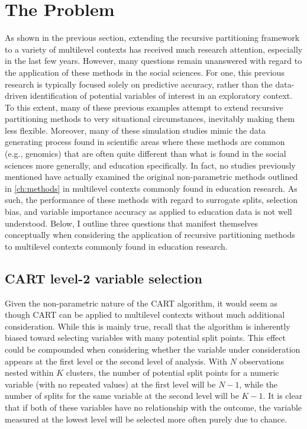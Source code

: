 
\chapter{The Problem} %

\label{ch:problem} %


	As shown in the previous section, extending the recursive partitioning framework to a variety of multilevel contexts has received much research attention, especially in the last few years. However, many questions remain unanswered with regard to the application of these methods in the social sciences. For one, this previous research is typically focused solely on predictive accuracy, rather than the data-driven identification of potential variables of interest in an exploratory context. To this extent, many of these previous examples attempt to extend recursive partitioning methods to very situational circumstances, inevitably making them less flexible. Moreover, many of these simulation studies mimic the data generating process found in scientific areas where these methods are common (e.g., genomics) that are often quite different than what is found in the social sciences more generally, and education specifically. In fact, no studies previously mentioned have actually examined the original non-parametric methods outlined in \autoref{ch:methods} in multilevel contexts commonly found in education research. As such, the performance of these methods with regard to surrogate splits, selection bias, and variable importance accuracy as applied to education data is not well understood. Below, I outline three questions that manifest themselves conceptually when considering the application of recursive partitioning methods to multilevel contexts commonly found in education research. 



\section{CART level-2 variable selection}


	Given the non-parametric nature of the CART algorithm, it would seem as though CART can be applied to multilevel contexts without much additional consideration. While this is mainly true, recall that the algorithm is inherently biased toward selecting variables with many potential split points. This effect could be compounded when considering whether the variable under consideration appears at the first level or the second level of analysis. With $N$ observations nested within $K$ clusters, the number of potential split points for a numeric variable (with no repeated values) at the first level will be $N - 1$, while the number of splits for the same variable at the second level will be $K - 1$. It is clear that if both of these variables have no relationship with the outcome, the variable measured at the lowest level will be selected more often purely due to chance. 


